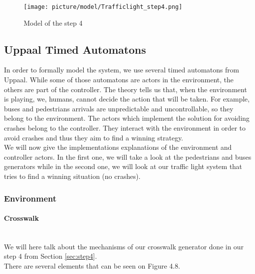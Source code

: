 \begin{figure}[H]\label{fig:step4}
  \centering
    \texttt{[image: picture/model/Trafficlight\_step4.png]}
    \caption{Model of the step 4}
\end{figure}

\subsection{Uppaal Timed Automatons}
In order to formally model the system, we use several timed automatons from Uppaal. While some of those automatons are actors in the environment, the others are part of the controller.
The theory tells us that, when the environment is playing, we, humans, cannot decide the action that will be taken. For example, buses and pedestrians arrivals are unpredictable and uncontrollable, so they belong to the environment.
The actors which implement the solution for avoiding crashes belong to the controller. They interact with the environment in order to avoid crashes and thus they aim to find a winning strategy. \\
We will now give the implementations explanations of the environment and controller actors. In the first one, we will take a look at the pedestrians and buses generators while in the second one, we will look at our traffic light system that tries to find a winning situation (no crashes).

\subsubsection{Environment}
\paragraph{Crosswalk} \mbox{}\\
We will here talk about the mechanisms of our crosswalk generator done in our step 4 from Section \ref{sec:step4}. \\
There are several elements that can be seen on Figure 4.8.

